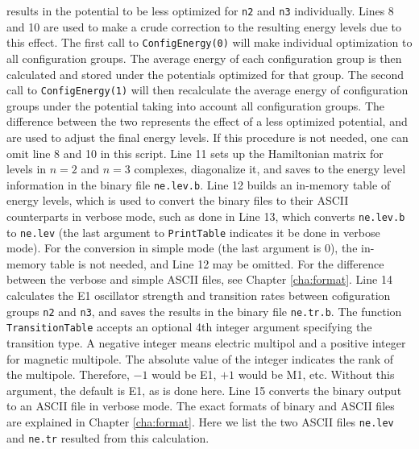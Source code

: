 \documentclass[twoside,letterpaper]{refrep}
\begin{document}
results in the potential to be less optimized for \verb|n2| and \verb|n3|
individually. Lines 8 and 10 are used to make a crude correction to the
resulting energy levels due to this effect. The first call to
\verb|ConfigEnergy(0)| will make individual optimization to all configuration
groups. The average energy of each configuration group is then calculated and
stored under the potentials optimized for that group. The
second call to \verb|ConfigEnergy(1)| will then recalculate the average energy
of configuration groups under the potential taking into account all
configuration groups. The difference between the two represents the effect of
a less optimized potential, and are used to adjust the final energy levels. If
this procedure is not needed, one can omit line 8 and 10 in this script. Line
11 sets up the Hamiltonian matrix for levels in $n = 2$ and $n = 3$ complexes,
diagonalize it, and saves to the energy level information in the binary file
\verb|ne.lev.b|. Line 12 builds an in-memory table of energy levels, which is
used to convert the binary files to their ASCII counterparts in verbose mode,
such as done in Line 13, which converts \verb|ne.lev.b| to \verb|ne.lev| (the
last argument to \verb|PrintTable| indicates it be done in verbose mode). For
the conversion in simple mode (the last argument is 0), the in-memory table is
not needed, and Line 12 may be omitted. For the difference between the verbose
and simple ASCII files, see Chapter \ref{cha:format}. Line 14 calculates the
E1 oscillator strength and transition rates between cofiguration groups
\verb|n2| and \verb|n3|, and saves the results in the binary file
\verb|ne.tr.b|. The function \verb|TransitionTable| accepts an optional 4th
integer argument specifying the transition type. A negative integer means
electric multipol and a positive integer for magnetic multipole. The absolute
value of the integer indicates the rank of the multipole. Therefore, $-1$ would
be E1, $+1$ would be M1, etc. Without this argument, the default is E1, as is
done here. Line 15 converts the binary output to an ASCII file in verbose
mode. The exact formats of binary and ASCII files are explained in Chapter
\ref{cha:format}. Here we list the two ASCII files \verb|ne.lev| and
\verb|ne.tr| resulted from this calculation. 
\end{document}
